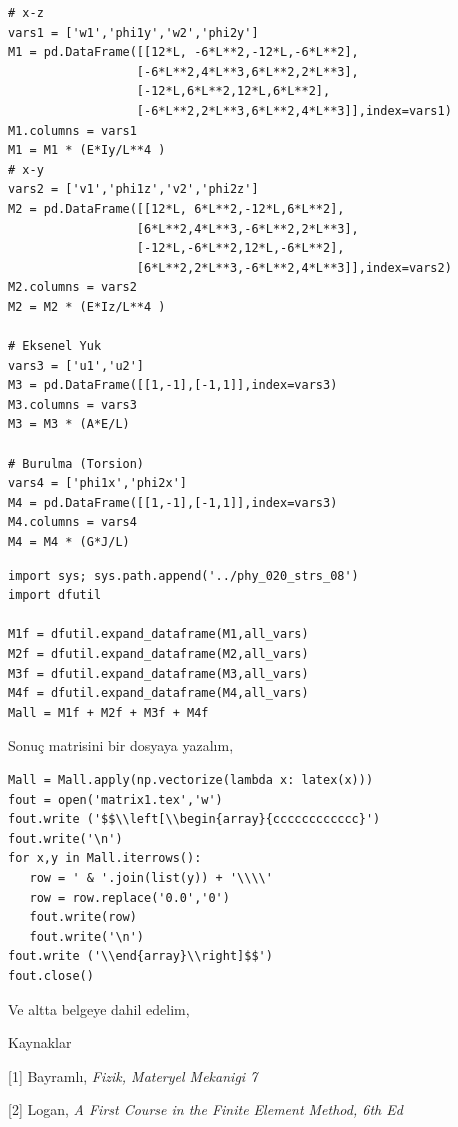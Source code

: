 \documentclass[12pt,fleqn]{article}\usepackage{../../common}
\begin{document}
\begin{verbatim}
# x-z
vars1 = ['w1','phi1y','w2','phi2y']
M1 = pd.DataFrame([[12*L, -6*L**2,-12*L,-6*L**2],
                  [-6*L**2,4*L**3,6*L**2,2*L**3],
                  [-12*L,6*L**2,12*L,6*L**2],
                  [-6*L**2,2*L**3,6*L**2,4*L**3]],index=vars1)
M1.columns = vars1
M1 = M1 * (E*Iy/L**4 )
# x-y
vars2 = ['v1','phi1z','v2','phi2z']
M2 = pd.DataFrame([[12*L, 6*L**2,-12*L,6*L**2],
                  [6*L**2,4*L**3,-6*L**2,2*L**3],
                  [-12*L,-6*L**2,12*L,-6*L**2],
                  [6*L**2,2*L**3,-6*L**2,4*L**3]],index=vars2)
M2.columns = vars2
M2 = M2 * (E*Iz/L**4 )

# Eksenel Yuk
vars3 = ['u1','u2']
M3 = pd.DataFrame([[1,-1],[-1,1]],index=vars3)
M3.columns = vars3
M3 = M3 * (A*E/L)

# Burulma (Torsion)
vars4 = ['phi1x','phi2x']
M4 = pd.DataFrame([[1,-1],[-1,1]],index=vars3)
M4.columns = vars4
M4 = M4 * (G*J/L)
\end{verbatim}

\begin{verbatim}
import sys; sys.path.append('../phy_020_strs_08')
import dfutil

M1f = dfutil.expand_dataframe(M1,all_vars)
M2f = dfutil.expand_dataframe(M2,all_vars)
M3f = dfutil.expand_dataframe(M3,all_vars)
M4f = dfutil.expand_dataframe(M4,all_vars)
Mall = M1f + M2f + M3f + M4f
\end{verbatim}

Sonuç matrisini bir dosyaya yazalım, 

\begin{verbatim}
Mall = Mall.apply(np.vectorize(lambda x: latex(x)))
fout = open('matrix1.tex','w')
fout.write ('$$\\left[\\begin{array}{cccccccccccc}')
fout.write('\n')
for x,y in Mall.iterrows():
   row = ' & '.join(list(y)) + '\\\\'
   row = row.replace('0.0','0')
   fout.write(row)
   fout.write('\n')
fout.write ('\\end{array}\\right]$$')
fout.close()
\end{verbatim}

Ve altta belgeye dahil edelim,



Kaynaklar

[1] Bayramlı, {\em Fizik, Materyel Mekanigi 7}

[2] Logan, {\em A First Course in the Finite Element Method, 6th Ed}
\end{document}
